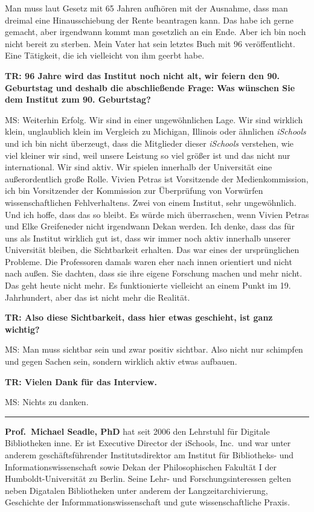 \documentclass[a4paper,
fontsize=11pt,
oneside,
numbers=noperiodatend,
parskip=half-,
bibliography=totoc,
final
]{scrartcl}
\begin{document}
Man muss laut Gesetz mit 65 Jahren aufhören mit der Ausnahme, dass man
dreimal eine Hinausschiebung der Rente beantragen kann. Das habe ich
gerne gemacht, aber irgendwann kommt man gesetzlich an ein Ende. Aber
ich bin noch nicht bereit zu sterben. Mein Vater hat sein letztes Buch
mit 96 veröffentlicht. Eine Tätigkeit, die ich vielleicht von ihm geerbt
habe.

\textbf{TR: 96 Jahre wird das Institut noch nicht alt, wir feiern den
90. Geburtstag und deshalb die abschließende Frage: Was wünschen Sie dem
Institut zum 90. Geburtstag?}

MS: Weiterhin Erfolg. Wir sind in einer ungewöhnlichen Lage. Wir sind
wirklich klein, unglaublich klein im Vergleich zu Michigan, Illinois
oder ähnlichen \emph{iSchools} und ich bin nicht überzeugt, dass die
Mitglieder dieser \emph{iSchools} verstehen, wie viel kleiner wir sind,
weil unsere Leistung so viel größer ist und das nicht nur international.
Wir sind aktiv. Wir spielen innerhalb der Universität eine
außerordentlich große Rolle. Vivien Petras ist Vorsitzende der
Medienkommission, ich bin Vorsitzender der Kommission zur Überprüfung
von Vorwürfen wissenschaftlichen Fehlverhaltens. Zwei von einem
Institut, sehr ungewöhnlich. Und ich hoffe, dass das so bleibt. Es würde
mich überraschen, wenn Vivien Petras und Elke Greifeneder nicht
irgendwann Dekan werden. Ich denke, dass das für uns als Institut
wirklich gut ist, dass wir immer noch aktiv innerhalb unserer
Universität bleiben, die Sichtbarkeit erhalten. Das war eines der
ursprünglichen Probleme. Die Professoren damals waren eher nach innen
orientiert und nicht nach außen. Sie dachten, dass sie ihre eigene
Forschung machen und mehr nicht. Das geht heute nicht mehr. Es
funktionierte vielleicht an einem Punkt im 19. Jahrhundert, aber das ist
nicht mehr die Realität.

\textbf{TR: Also diese Sichtbarkeit, dass hier etwas geschieht, ist ganz
wichtig?}

MS: Man muss sichtbar sein und zwar positiv sichtbar. Also nicht nur
schimpfen und gegen Sachen sein, sondern wirklich aktiv etwas aufbauen.

\textbf{TR: Vielen Dank für das Interview.}

MS: Nichts zu danken.

\begin{center}\rule{0.5\linewidth}{\linethickness}\end{center}

\textbf{Prof.~Michael Seadle, PhD} hat seit 2006 den Lehrstuhl für
Digitale Bibliotheken inne. Er ist Executive Director der iSchools,
Inc.~und war unter anderem geschäftsführender Institutsdirektor am
Institut für Bibliotheks- und Informationswissenschaft sowie Dekan der
Philosophischen Fakultät I der Humboldt-Universität zu Berlin. Seine
Lehr- und Forschungsinteressen gelten neben Digatalen Bibliotheken unter
anderem der Langzeitarchivierung, Geschichte der
Informmationswissenschaft und gute wissenschaftliche Praxis.
\end{document}
